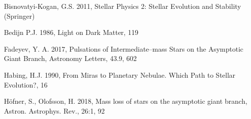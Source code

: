 \documentclass[a4paper,12pt]{article}
\begin{document}
\begin{thebibliography}{9}
    
    Bisnovatyi-Kogan, G.S. 2011, Stellar Physics 2: Stellar Evolution and Stability (Springer)
    

    Bedijn P.J. 1986, Light on Dark Matter, 119


    Fadeyev, Y. A. 2017, Pulsations of Intermediate–mass Stars on the Asymptotic Giant Branch,  Astronomy Letters, 43.9, 602


    Habing, H.J. 1990, From Miras to Planetary Nebulae. Which Path to Stellar Evolution?, 16 

    Höfner, S., Olofsson, H. 2018, Mass loss of stars on the asymptotic giant branch, Astron. Astrophys. Rev., 26:1, 92




\end{thebibliography}
\end{document}
